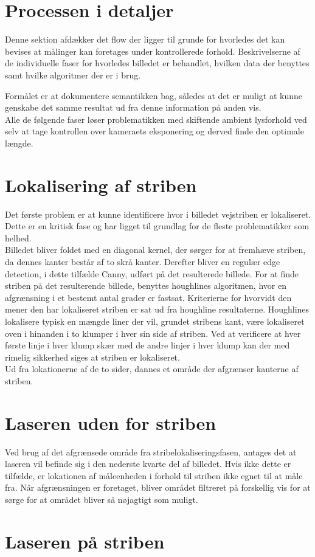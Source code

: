 \section{Processen i detaljer}

Denne sektion afdækker det flow der ligger til grunde for hvorledes det kan bevises at målinger kan foretages under kontrollerede forhold. Beskrivelserne af de individuelle faser for hvorledes billedet er behandlet, hvilken data der benyttes samt hvilke algoritmer der er i brug.

Formålet er at dokumentere semantikken bag, således at det er muligt at kunne genskabe det samme resultat ud fra denne information på anden vis.
\\

Alle de følgende faser løser problematikken med skiftende ambient lysforhold ved selv at tage kontrollen over kameraets eksponering og derved finde den optimale længde.

\section{Lokalisering af striben}
Det første problem er at kunne identificere hvor i billedet vejstriben er lokaliseret. Dette er en kritisk fase og har ligget til grundlag for de fleste problematikker som helhed.
\\
Billedet bliver foldet med en diagonal kernel, der sørger for at fremhæve striben, da dennes kanter består af to skrå kanter.
Derefter bliver en regulær edge detection, i dette tilfælde Canny, udført på det resulterede billede. For at finde striben på det resulterende billede, benyttes houghlines algoritmen, hvor en afgrænsning i et bestemt antal grader er fastsat. Kriterierne for hvorvidt den mener den har lokaliseret striben er sat ud fra houghline resultaterne. Houghlines lokalisere typisk en mængde liner der vil, grundet stribens kant, være lokaliseret oven i hinanden i to klumper i hver sin side af striben.
Ved at verificere at hver første linje i hver klump skær med de andre linjer i hver klump kan der med rimelig sikkerhed siges at striben er lokaliseret.
\\
Ud fra lokationerne af de to sider, dannes et område der afgrænser kanterne af striben.

\section{Laseren uden for striben}
Ved brug af det afgrænsede område fra stribelokaliseringsfasen, antages det at laseren vil befinde sig i den nederste kvarte del af billedet. Hvis ikke dette er tilfælde, er lokationen af måleenheden i forhold til striben ikke egnet til at måle fra.
Når afgrænsningen er foretaget, bliver området filtreret på forskellig vis for at sørge for at området bliver så nøjagtigt som muligt.


\section{Laseren på striben}
